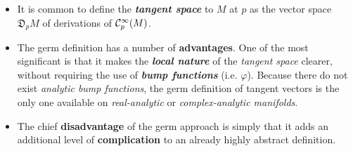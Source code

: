 \documentclass[11pt]{article}
\begin{document}
\begin{itemize}
\item It is common to define the \emph{\textbf{tangent space}} to $M$ at $p$ as the vector space $\mathfrak{D}_{p}M$ of derivations of ${\mathcal C}_{p}^{\infty}(M)$. 

\item The germ definition has a number of \textbf{advantages}. One of the most significant is that it makes the \emph{\textbf{local nature}} of the \emph{tangent space} clearer, without requiring the use of \textbf{\emph{bump functions}} (i.e. $\varphi$). Because there do not exist \emph{analytic bump functions}, the germ definition of tangent vectors is the only one available on \emph{real-analytic} or \emph{complex-analytic manifolds}. 

\item The chief \textbf{disadvantage} of the germ approach is simply that it adds an additional level of \textbf{complication} to an already highly abstract definition.
\end{itemize}
\end{document}
